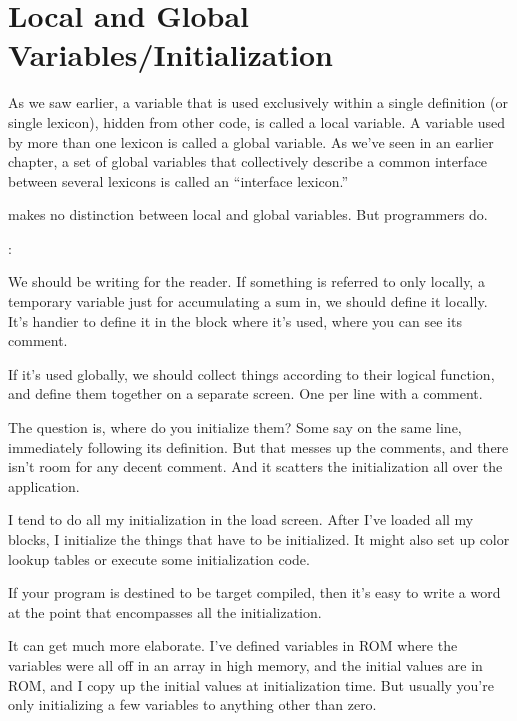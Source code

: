 \section{Local and Global Variables/Initialization}%
%
%
%
%

As we saw earlier, a variable that is used exclusively within a single
definition (or single lexicon), hidden from other code, is called a local
variable. A variable used by more than one lexicon is called a global
variable. As we've seen in an earlier chapter, a set of global variables that
collectively describe a common interface between several lexicons is
called an ``interface lexicon.''

\Forth{} makes no distinction between local and global variables.
But \Forth{} programmers do.

\begin{interview}%
:

\begin{tfquot}
We should be writing for the reader. If something is referred to only
locally, a temporary variable just for accumulating a sum in, we should
define it locally. It's handier to define it in the block where it's used,
where you can see its comment.

If it's used globally, we should collect things according to their logical
function, and define them together on a separate screen. One per line with
a comment.

The question is, where do you initialize them? Some say on the same line,
immediately following its definition. But that messes up the comments, and
there isn't room for any decent comment. And it scatters the
initialization all over the application.

I tend to do all my initialization in the load screen. After I've loaded
all my blocks, I initialize the things that have to be initialized. It
might also set up color lookup tables or execute some initialization code.

If your program is destined to be target compiled, then it's easy to write
a word at the point that encompasses all the initialization.

It can get much more elaborate. I've defined variables in ROM where the
variables were all off in an array in high memory, and the initial values are
in ROM, and I copy up the initial values at initialization time. But usually
you're only initializing a few variables to anything other than zero.
\end{tfquot}%
\end{interview}%
%
%
%
%

